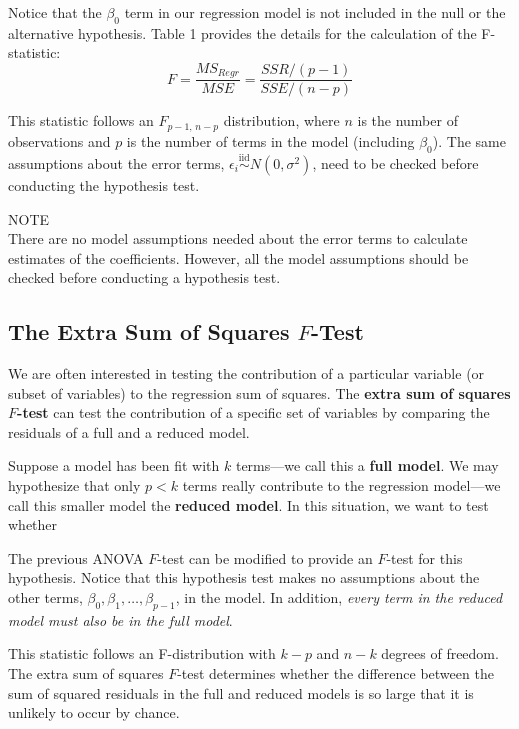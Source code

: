 \documentclass[
]{report}
\theoremstyle{definition}
\theoremstyle{definition}
\theoremstyle{definition}
\theoremstyle{definition}
\theoremstyle{remark}
\begin{document}
Notice that the \(\beta_0\) term in our regression model is not included in the null or the alternative hypothesis. Table 1 provides the details for the calculation of the F-statistic:
\begin{equation}
F = \frac{MS_{Regr}}{MSE}
  = \frac{SSR/(p - 1)}{SSE/(n - p)}
\tag{3.11}
\end{equation}

This statistic follows an \(F_{p-1,\,n-p}\) distribution, where \(n\) is the number of observations and \(p\) is the number of terms in the model (including \(\beta_0\)). The same assumptions about the error terms, \(\epsilon_i \overset{\mathrm{iid}}{\sim}N(0,\sigma^2)\), need to be checked before conducting the hypothesis test.

NOTE\\
There are no model assumptions needed about the error terms to calculate estimates of the coefficients. However, all the model assumptions should be checked before conducting a hypothesis test.

\hypertarget{the-extra-sum-of-squares-f-test}{%
\subsection{\texorpdfstring{The Extra Sum of Squares \(F\)-Test}{The Extra Sum of Squares F-Test}}\label{the-extra-sum-of-squares-f-test}}

We are often interested in testing the contribution of a particular variable (or subset of variables) to the regression sum of squares. The \textbf{extra sum of squares \(F\)-test} can test the contribution of a specific set of variables by comparing the residuals of a full and a reduced model.

Suppose a model has been fit with \(k\) terms---we call this a \textbf{full model}. We may hypothesize that only \(p < k\) terms really contribute to the regression model---we call this smaller model the \textbf{reduced model}. In this situation, we want to test whether

The previous ANOVA \(F\)-test can be modified to provide an \(F\)-test for this hypothesis. Notice that this hypothesis test makes no assumptions about the other terms, \(\beta_0, \beta_1, \dots, \beta_{p-1}\), in the model. In addition, \emph{every term in the reduced model must also be in the full model}.

This statistic follows an F-distribution with \(k-p\) and \(n-k\) degrees of freedom. The extra sum of squares \(F\)-test determines whether the difference between the sum of squared residuals in the full and reduced
models is so large that it is unlikely to occur by chance.
\end{document}
